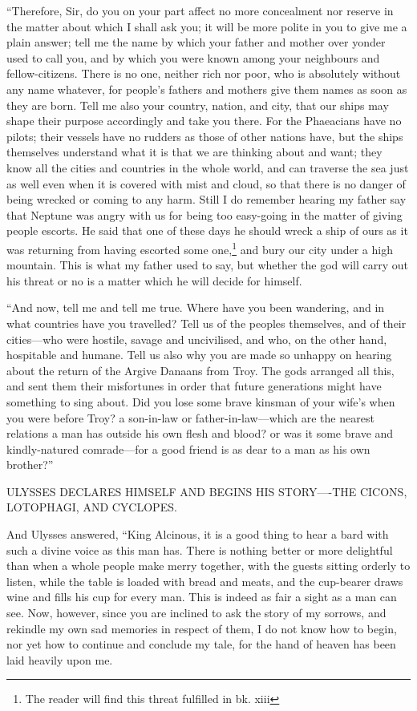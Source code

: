 “Therefore, Sir, do you on your part affect no more concealment nor reserve in
the matter about which I shall ask you; it will be more polite in you to give
me a plain answer; tell me the name by which your father and mother over yonder
used to call you, and by which you were known among your neighbours and
fellow-citizens. There is no one, neither rich nor poor, who is absolutely
without any name whatever, for people’s fathers and mothers give them names as
soon as they are born. Tell me also your country, nation, and city, that our
ships may shape their purpose accordingly and take you there. For the
Phaeacians have no pilots; their vessels have no rudders as those of other
nations have, but the ships themselves understand what it is that we are
thinking about and want; they know all the cities and countries in the whole
world, and can traverse the sea just as well even when it is covered with mist
and cloud, so that there is no danger of being wrecked or coming to any harm.
Still I do remember hearing my father say that Neptune was angry with us for
being too easy-going in the matter of giving people escorts. He said that one
of these days he should wreck a ship of ours as it was returning from having
escorted some one,\footnote{The reader will find this threat fulfilled in bk. xiii} and bury our city under a high
mountain. This is what my father used to say, but whether the god will carry
out his threat or no is a matter which he will decide for himself.

“And now, tell me and tell me true. Where have you been wandering, and in what
countries have you travelled? Tell us of the peoples themselves, and of their
cities—who were hostile, savage and uncivilised, and who, on the other hand,
hospitable and humane. Tell us also why you are made so unhappy on hearing
about the return of the Argive Danaans from Troy. The gods arranged all this,
and sent them their misfortunes in order that future generations might have
something to sing about. Did you lose some brave kinsman of your wife’s when
you were before Troy? a son-in-law or father-in-law—which are the nearest
relations a man has outside his own flesh and blood? or was it some brave and
kindly-natured comrade—for a good friend is as dear to a man as his own
brother?”


ULYSSES DECLARES HIMSELF AND BEGINS HIS STORY—-THE CICONS, LOTOPHAGI, AND
CYCLOPES.

And Ulysses answered, “King Alcinous, it is a good thing to hear a bard with
such a divine voice as this man has. There is nothing better or more delightful
than when a whole people make merry together, with the guests sitting orderly
to listen, while the table is loaded with bread and meats, and the cup-bearer
draws wine and fills his cup for every man. This is indeed as fair a sight as a
man can see. Now, however, since you are inclined to ask the story of my
sorrows, and rekindle my own sad memories in respect of them, I do not know how
to begin, nor yet how to continue and conclude my tale, for the hand of heaven
has been laid heavily upon me.

